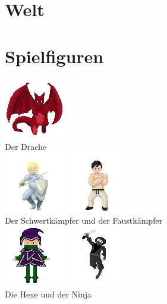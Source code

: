 \documentclass[10pt,a4paper,notitlepage]{report}
\begin{document}
\begin{flushleft}
\section{Welt}
\section{Spielfiguren}
\begin{center}
	\includegraphics[scale=3]{Drache.png}\\
	Der Drache\\
		
	\includegraphics[scale=2]{Schwertkaempfer.png}
	\includegraphics[scale=2]{Faustkaempfer.png}\\
	Der Schwertkämpfer und der Faustkämpfer\\
	
	\includegraphics[scale=2]{Hexe}
	\includegraphics[scale=2]{Ninja}\\
	Die Hexe und der Ninja\\
	

\end{center}
\end{flushleft}
\end{document}
